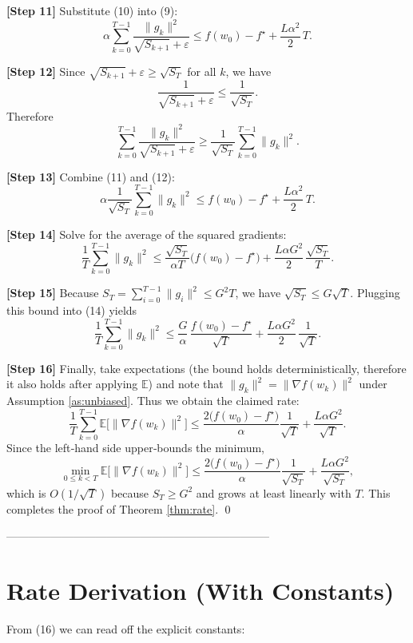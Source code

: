 \documentclass[11pt]{article}
\newcommand{\E}{\mathbb{E}}
\begin{document}
\noindent\textbf{[Step 11]} Substitute (10) into (9):
\[
\alpha\sum_{k=0}^{T-1}\frac{\|g_{k}\|^{2}}{\sqrt{S_{k+1}}+\varepsilon}
\le f(w_{0})-f^{\star}+ \frac{L\alpha^{2}}{2}\,T.
\tag{11}
\]

\noindent\textbf{[Step 12]} Since $\sqrt{S_{k+1}}+\varepsilon\ge\sqrt{S_{T}}$ for
all $k$, we have
\[
\frac{1}{\sqrt{S_{k+1}}+\varepsilon}\le\frac{1}{\sqrt{S_{T}}}.
\]
Therefore
\[
\sum_{k=0}^{T-1}\frac{\|g_{k}\|^{2}}{\sqrt{S_{k+1}}+\varepsilon}
\ge
\frac{1}{\sqrt{S_{T}}}\sum_{k=0}^{T-1}\|g_{k}\|^{2}.
\tag{12}
\]

\noindent\textbf{[Step 13]} Combine (11) and (12):
\[
\alpha\frac{1}{\sqrt{S_{T}}}\sum_{k=0}^{T-1}\|g_{k}\|^{2}
\le f(w_{0})-f^{\star}+ \frac{L\alpha^{2}}{2}\,T.
\tag{13}
\]

\noindent\textbf{[Step 14]} Solve for the average of the squared gradients:
\[
\frac{1}{T}\sum_{k=0}^{T-1}\|g_{k}\|^{2}
\le
\frac{\sqrt{S_{T}}}{\alpha T}\bigl(f(w_{0})-f^{\star}\bigr)
   +\frac{L\alpha G^{2}}{2}\,\frac{\sqrt{S_{T}}}{T}.
\tag{14}
\]

\noindent\textbf{[Step 15]} Because $S_{T}= \sum_{i=0}^{T-1}\|g_{i}\|^{2}\le G^{2}T$,
we have $\sqrt{S_{T}}\le G\sqrt{T}$. Plugging this bound into (14) yields
\[
\frac{1}{T}\sum_{k=0}^{T-1}\|g_{k}\|^{2}
\le
\frac{G}{\alpha}\,\frac{f(w_{0})-f^{\star}}{\sqrt{T}}
   +\frac{L\alpha G^{2}}{2}\,\frac{1}{\sqrt{T}}.
\tag{15}
\]

\noindent\textbf{[Step 16]} Finally, take expectations (the bound holds
deterministically, therefore it also holds after applying $\E$) and note that
$\|g_{k}\|^{2}=\|\nabla f(w_{k})\|^{2}$ under Assumption \ref{as:unbiased}.
Thus we obtain the claimed rate:
\[
\frac{1}{T}\sum_{k=0}^{T-1}\E\!\bigl[\|\nabla f(w_{k})\|^{2}\bigr]
\le
\frac{2\bigl(f(w_{0})-f^{\star}\bigr)}{\alpha}\frac{1}{\sqrt{T}}
   +\frac{L\alpha G^{2}}{\sqrt{T}}.
\tag{16}
\]
Since the left‑hand side upper‑bounds the minimum,
\[
\min_{0\le k<T}\E\!\bigl[\|\nabla f(w_{k})\|^{2}\bigr]
\le
\frac{2\bigl(f(w_{0})-f^{\star}\bigr)}{\alpha}\frac{1}{\sqrt{S_{T}}}
   +\frac{L\alpha G^{2}}{\sqrt{S_{T}}},
\]
which is $O(1/\sqrt{T})$ because $S_{T}\ge G^{2}$ and grows at least linearly
with $T$. This completes the proof of Theorem \ref{thm:rate}.
\qed

-----------------------------------------------------------------------

\section*{Rate Derivation (With Constants)}
From (16) we can read off the explicit constants:
\end{document}
